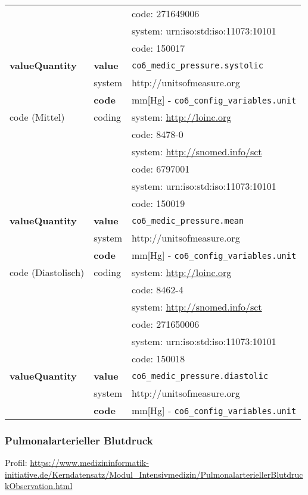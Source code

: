 \begin{longtable}{|l|l|p{7.5cm}|}
	&  & code: 271649006 \\ 
	\cline{3-3} 
	&  & system: urn:iso:std:iso:11073:10101 \\ 
	\cline{3-3}
	&  & code: 150017 \\ \hline
	\textbf{valueQuantity} & \textbf{value} & \texttt{co6\_medic\_pressure.systolic} \\
	\cline{2-3}
	& system & http://unitsofmeasure.org \\ 
	\cline{2-3}
	& \textbf{code} & mm[Hg] - \texttt{co6\_config\_variables.unit} \\ \hline
	code (Mittel) & coding & system: \url{http://loinc.org} \\ 
	\cline{3-3} 
	&  & code: 8478-0 \\ 
	\cline{3-3} 
	&  & system: \url{http://snomed.info/sct} \\ 
	\cline{3-3} 
	&  & code: 6797001 \\ 
	\cline{3-3} 
	&  & system: urn:iso:std:iso:11073:10101 \\ 
	\cline{3-3}
	&  & code: 150019 \\ \hline	
	\textbf{valueQuantity} & \textbf{value} & \texttt{co6\_medic\_pressure.mean} \\
	\cline{2-3}
	& system & http://unitsofmeasure.org \\ 
	\cline{2-3}
	& \textbf{code} &  mm[Hg] - \texttt{co6\_config\_variables.unit} \\ \hline
	code (Diastolisch) & coding & system: \url{http://loinc.org} \\ 
	\cline{3-3} 
	&  & code: 8462-4 \\ 
	\cline{3-3} 
	&  & system: \url{http://snomed.info/sct} \\ 
	\cline{3-3} 
	&  & code: 271650006 \\ 
	\cline{3-3} 
	&  & system: urn:iso:std:iso:11073:10101 \\ 
	\cline{3-3}
	&  & code: 150018 \\ \hline	
	\textbf{valueQuantity} & \textbf{value} & \texttt{co6\_medic\_pressure.diastolic} \\
	\cline{2-3}
	& system & http://unitsofmeasure.org \\ 
	\cline{2-3}
	& \textbf{code} & mm[Hg] - \texttt{co6\_config\_variables.unit} \\ \hline
\end{longtable}

\subsubsection{Pulmonalarterieller Blutdruck} 
 Profil: \url{https://www.medizininformatik-initiative.de/Kerndatensatz/Modul_Intensivmedizin/PulmonalarteriellerBlutdruckObservation.html}

